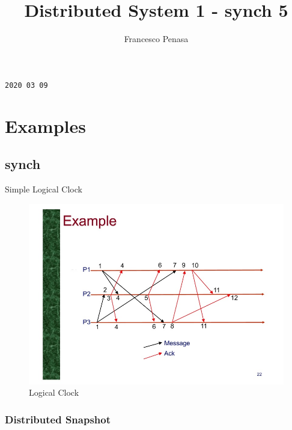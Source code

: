 \documentclass[11pt]{article}
\begin{document}
\author{Francesco Penasa}
\title{Distributed System 1 - synch 5}
\maketitle

\medskip

\texttt{2020 03 09}
\section{Examples} %
\label{sec:examples}
\subsection{synch} %
\label{sub:synch}

Simple Logical Clock
\begin{figure}[ht]
	\centering
	\includegraphics[scale=0.5]{figures/example_synch_1.jpg}
	\caption{Logical Clock}
	\label{fig:logical}
\end{figure}

\subsubsection{Distributed Snapshot} %
\label{ssub:distributed_snapshot}
\end{document}

